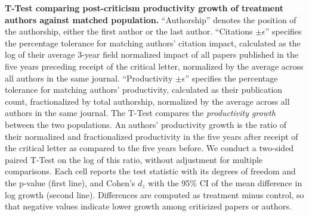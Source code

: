 \documentclass[12pt]{article} %
\begin{document}
\clearpage
\begin{landscape}
\begin{table}[p]
\scriptsize
\centering
\caption{
\textbf{T-Test comparing post-criticism productivity growth of treatment authors against matched population.}
``Authorship'' denotes the position of the authorship, either the first author or the last author. 
``Citations $\pm \epsilon$'' specifies the percentage tolerance for matching authors' citation impact, calculated as the log of their average 3-year field normalized impact of all papers published in the five years preceding receipt of the critical letter, normalized by the average across all authors in the same journal. 
``Productivity $\pm \epsilon$'' specifies the percentage tolerance for matching authors' productivity, calculated as their publication count, fractionalized by total authorship, normalized by the average across all authors in the same journal.
The T-Test compares the \textit{productivity growth} between the two populations. 
An authors' productivity growth is the ratio of their normalized and fractionalized productivity in the five years after receipt of the critical letter as compared to the five years before. 
We conduct a two-sided paired T-Test on the log of this ratio, without adjustment for multiple comparisons.
Each cell reports the test statistic with its degrees of freedom and the p-value (first line), and Cohen's $d_z$ with the 95\% CI of the mean difference in log growth (second line). Differences are computed as treatment minus control, so that negative values indicate lower growth among criticized papers or authors. 
}
\label{si:tab:authors-matched-productivity-ttest}
%
\end{table}
\end{landscape}
\end{document}
